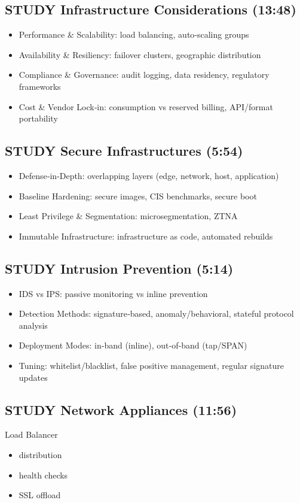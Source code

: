 \documentclass[11pt]{article}
\begin{document}
\subsection{{\bfseries\sffamily STUDY} Infrastructure Considerations (13:48)}
\label{sec:org3cf190c}
\begin{itemize}
\item Performance \& Scalability: load balancing, auto‑scaling groups
\item Availability \& Resiliency: failover clusters, geographic distribution
\item Compliance \& Governance: audit logging, data residency, regulatory frameworks
\item Cost \& Vendor Lock‑in: consumption vs reserved billing, API/format portability
\end{itemize}
\subsection{{\bfseries\sffamily STUDY} Secure Infrastructures (5:54)}
\label{sec:orgaae589d}
\begin{itemize}
\item Defense‑in‑Depth: overlapping layers (edge, network, host, application)
\item Baseline Hardening: secure images, CIS benchmarks, secure boot
\item Least Privilege \& Segmentation: microsegmentation, ZTNA
\item Immutable Infrastructure: infrastructure as code, automated rebuilds
\end{itemize}
\subsection{{\bfseries\sffamily STUDY} Intrusion Prevention (5:14)}
\label{sec:orga721f0a}
\begin{itemize}
\item IDS vs IPS: passive monitoring vs inline prevention
\item Detection Methods: signature‑based, anomaly/behavioral, stateful protocol analysis
\item Deployment Modes: in‑band (inline), out‑of‑band (tap/SPAN)
\item Tuning: whitelist/blacklist, false positive management, regular signature updates
\end{itemize}
\subsection{{\bfseries\sffamily STUDY} Network Appliances (11:56)}
\label{sec:org662aa5d}
Load Balancer
\begin{itemize}
\item distribution
\item health checks
\item SSL offload
\end{itemize}
\end{document}
